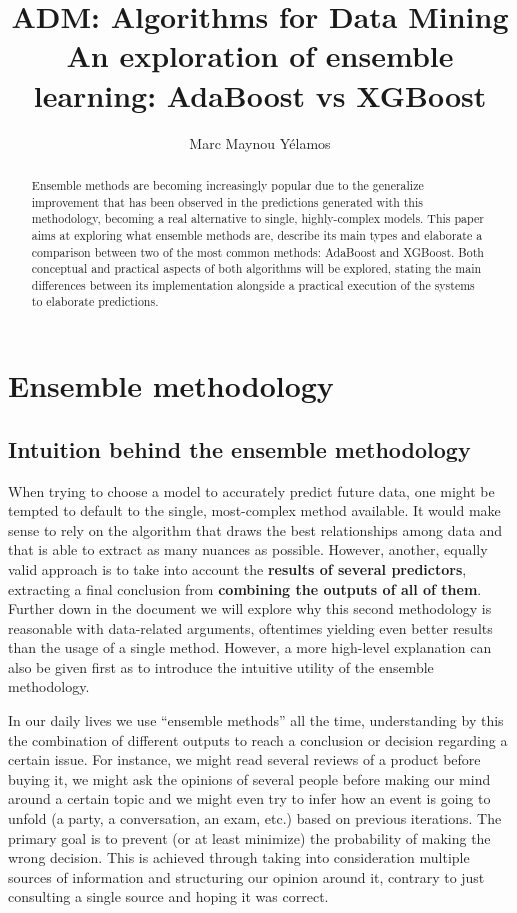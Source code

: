 \documentclass{article}
\title{ADM: Algorithms for Data Mining \\[1ex] \large An exploration of ensemble learning: AdaBoost vs XGBoost}
\author{Marc Maynou Yélamos }
\begin{document}
\maketitle

\begin{abstract}
Ensemble methods are becoming increasingly popular due to the generalize improvement that has been observed in the predictions generated with this methodology, becoming a real alternative to single, highly-complex models. This paper aims at exploring what ensemble methods are, describe its main types and elaborate a comparison between two of the most common methods: AdaBoost and XGBoost. Both conceptual and practical aspects of both algorithms will be explored, stating the main differences between its implementation alongside a practical execution of the systems to elaborate predictions.

\end{abstract}

\section{Ensemble methodology}
\subsection{Intuition behind the ensemble methodology}

When trying to choose a model to accurately predict future data, one might be tempted to default to the single, most-complex method available. It would make sense to rely on the algorithm that draws the best relationships among data and that is able to extract as many nuances as possible. However, another, equally valid approach is to take into account the \textbf{results of several predictors}, extracting a final conclusion from \textbf{combining the outputs of all of them}. Further down in the document we will explore why this second methodology is reasonable with data-related arguments, oftentimes yielding even better results than the usage of a single method. However, a more high-level explanation can also be given first as to introduce the intuitive utility of the ensemble methodology.

In our daily lives we use “ensemble methods” all the time, understanding by this the combination of different outputs to reach a conclusion or decision regarding a certain issue. For instance, we might read several reviews of a product before buying it, we might ask the opinions of several people before making our mind around a certain topic and we might even try to infer how an event is going to unfold (a party, a conversation, an exam, etc.) based on previous iterations. The primary goal is to prevent (or at least minimize) the probability of making the wrong decision. This is achieved through taking into consideration multiple sources of information and structuring our opinion around it, contrary to just consulting a single source and hoping it was correct.
\end{document}
